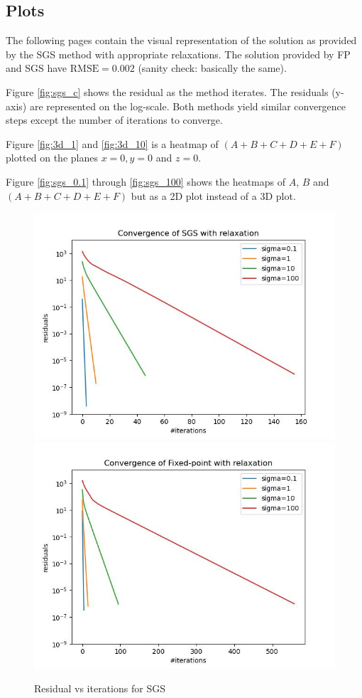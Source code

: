 \documentclass[11pt,titlepage]{article}
\begin{document}
\subsection{Plots}

The following pages contain the visual representation of the solution as provided by the SGS method with appropriate
relaxations. The solution provided by FP and SGS have $\text{RMSE}=0.002$ (sanity check: basically the same).

Figure \ref{fig:sgs_c} shows the residual as the method iterates. The residuals (y-axis) are represented on the
log-scale. Both methods yield similar convergence steps except the number of iterations to converge.

Figure \ref{fig:3d_1} and \ref{fig:3d_10} is a heatmap of $(A + B + C + D + E + F)$ plotted on the planes $x = 0, y =
0$ and $z = 0$.

Figure \ref{fig:sgs_0.1} through \ref{fig:sgs_100} shows the heatmaps of $A$, $B$ and $(A + B + C + D + E + F)$ but as a
2D plot instead of a 3D plot.


\begin{figure}[H]
    \centering
    \caption{Residual vs iterations for SGS}
    \includegraphics[scale=0.8]{img/sgs_convergence.jpg}
    \label{fig:sgs_c}
    \includegraphics[scale=0.8]{img/fp_convergence.jpg}
    \label{fig:fp_c}
\end{figure}
\end{document}
